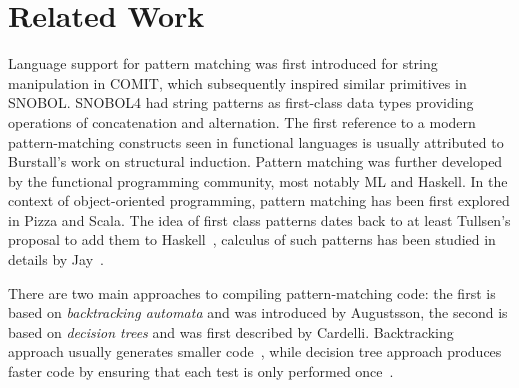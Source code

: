 \section{Related Work} %
\label{sec:rw}

Language support for pattern matching was first introduced for string manipulation 
in COMIT\cite{COMIT58}, which subsequently inspired similar primitives in 
SNOBOL\cite{SNOBOL64}. SNOBOL4 had string patterns as first-class data types 
providing operations of concatenation and alternation.
The first reference to a modern pattern-matching constructs seen in functional 
languages is usually attributed to Burstall's work on structural 
induction\cite{Burstall69provingproperties}. Pattern matching was further 
developed by the functional programming community, most notably 
ML\cite{ML78} and Haskell\cite{haskell90}. In the context of object-oriented programming, 
pattern matching has been first explored in Pizza\cite{Odersky97pizzainto} and 
Scala\cite{Scala2nd,EmirThesis}. The idea of first class patterns dates back to 
at least Tullsen's proposal to add them to Haskell~\cite{Tullsen00}, calculus of 
such patterns has been studied in details by Jay~\cite{Jay09,PatCalc09}.

There are two main approaches to compiling pattern-matching code: the first is 
based on \emph{backtracking automata} and was introduced by Augustsson\cite{Augustsson85}, 
the second is based on \emph{decision trees} and was first described by 
Cardelli\cite{Cardelli84}. %
Backtracking approach usually generates smaller code~\cite{OPM01}, while decision tree 
approach produces faster code by ensuring that each test is only 
performed once~\cite{Maranget08}. %

